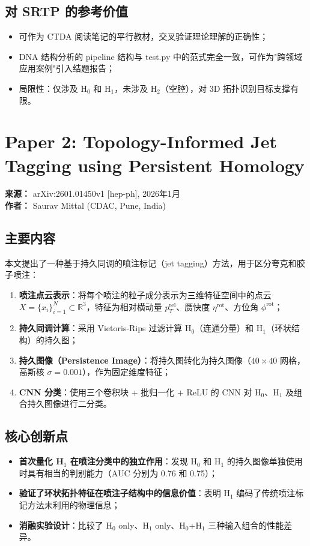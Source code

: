 \documentclass[11pt,a4paper]{article}
\begin{document}
\subsection*{对 SRTP 的参考价值}
\begin{itemize}[nosep]
  \item 可作为 CTDA 阅读笔记的平行教材，交叉验证理论理解的正确性；
  \item DNA 结构分析的 pipeline 结构与 test.py 中的范式完全一致，可作为"跨领域应用案例"引入结题报告；
  \item 局限性：仅涉及 H$_0$ 和 H$_1$，未涉及 H$_2$（空腔），对 3D 拓扑识别目标支撑有限。
\end{itemize}


\section{Paper 2: Topology-Informed Jet Tagging using Persistent Homology}

\textbf{来源：} arXiv:2601.01450v1 [hep-ph], 2026年1月 \\
\textbf{作者：} Saurav Mittal (CDAC, Pune, India)

\subsection*{主要内容}
本文提出了一种基于持久同调的喷注标记（jet tagging）方法，用于区分夸克和胶子喷注：

\begin{enumerate}[nosep]
  \item \textbf{喷注点云表示}：将每个喷注的粒子成分表示为三维特征空间中的点云 $X = \{x_i\}_{i=1}^N \subset \mathbb{R}^3$，特征为相对横动量 $p_T^{\text{rel}}$、赝快度 $\eta^{\text{rot}}$、方位角 $\phi^{\text{rot}}$；
  \item \textbf{持久同调计算}：采用 Vietoris-Rips 过滤计算 H$_0$（连通分量）和 H$_1$（环状结构）的持久图；
  \item \textbf{持久图像（Persistence Image）}：将持久图转化为持久图像（$40\times40$ 网格，高斯核 $\sigma=0.001$），作为固定维度特征；
  \item \textbf{CNN 分类}：使用三个卷积块 + 批归一化 + ReLU 的 CNN 对 H$_0$、H$_1$ 及组合持久图像进行二分类。
\end{enumerate}

\subsection*{核心创新点}
\begin{itemize}[nosep]
  \item \textbf{首次量化 H$_1$ 在喷注分类中的独立作用}：发现 H$_0$ 和 H$_1$ 的持久图像单独使用时具有相当的判别能力（AUC 分别为 0.76 和 0.75）；
  \item \textbf{验证了环状拓扑特征在喷注子结构中的信息价值}：表明 H$_1$ 编码了传统喷注标记方法未利用的物理信息；
  \item \textbf{消融实验设计}：比较了 H$_0$ only、H$_1$ only、H$_0$+H$_1$ 三种输入组合的性能差异。
\end{itemize}
\end{document}
